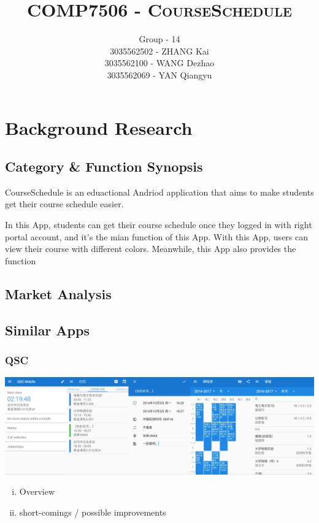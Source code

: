 \documentclass{article}
\title{\textsc{COMP7506 - CourseSchedule}}
\author{	Group - 14 \\
                3035562502 - ZHANG Kai \\
                3035562100 - WANG Dezhao \\
                3035562069 - YAN Qiangyu }
\date{}
\begin{document}
    \maketitle
    
    
    \section{Background Research}

    \subsection{Category \& Function Synopsis}
    CourseSchedule is an eduactional Andriod application that aims to 
    make students get their course schedule easier.
    
    In this App, students can get their course schedule
    once they logged in with right portal account, 
    and it's the mian function of this App.
    With this App, users can view their course with different colors.
    Meanwhile, this App also provides the function

    \subsection{Market Analysis}

    \subsection{Similar Apps}
    \subsubsection{QSC}
    \begin{center}
        \includegraphics[width=6.9in]{QSC}
    \end{center}
    \begin{enumerate}[i)]
        \item Overview
        \item short-comings / possible improvements
    \end{enumerate}
    
\end{document}
